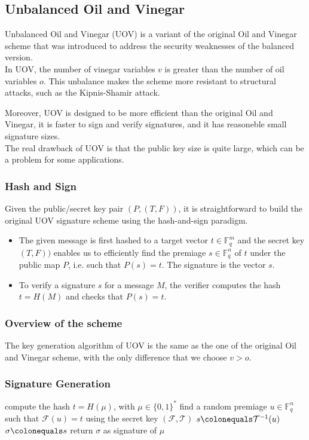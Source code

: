 \subsection{Unbalanced Oil and Vinegar}
Unbalanced Oil and Vinegar (UOV) is a variant of the original Oil and Vinegar scheme that was introduced to address the security weaknesses of the balanced version.\\
In UOV, the number of vinegar variables \(v\) is greater than the number of oil variables \(o\). This unbalance makes the scheme more resistant to structural attacks, such as the Kipnis-Shamir attack.
\medskip

\noindent
Moreover, UOV is designed to be more efficient than the original Oil and Vinegar, it is faster to sign and verify signatures, and it has reasoneble small signature sizes. \\
The real drawback of UOV is that the public key size is quite large, which can be a problem for some applications.

\subsubsection*{Hash and Sign}
Given the public/secret key pair \((P, (T, F))\), it is straightforward to build the original UOV signature scheme using the hash-and-sign paradigm.

\begin{itemize}
    \item The given message is first hashed to a target vector \(t \in \mathbb{F}_q^m\) and the secret key \((T, F))\) enables us to efficiently find the premiage \(s \in \mathbb{F}_q^n\) of \(t\) under the public map \(P\), i.e. such that \(P(s) = t\). The signature is the vector \(s\).
    \item To verify a signature \(s\) for a message \(M\), the verifier computes the hash \(t = H(M)\) and checks that \(P(s) = t \).     
\end{itemize}

\subsubsection{Overview of the scheme}
The key generation algorithm of UOV is the same as the one of the original Oil and Vinegar scheme, with the only difference that we choose \(v > o\).

\subsubsection*{Signature Generation}
\begin{algorithm}
\begin{algorithmic}[1]
    \State compute the hash $t = H(\mu)$, with $\mu \in \{0,1\}^*$
    \State find a random premiage $u \in \mathbb{F}_q^n$ such that $\mathcal{F}(u) = t$ using the secret key $(\mathcal{F},\mathcal{T})$
    \State $s \colonequals \mathcal{T}^{-1}(u)$
    \State $\sigma \colonequals s$
    \State return $\sigma$ as signature of $\mu$
\end{algorithmic}
\end{algorithm}

